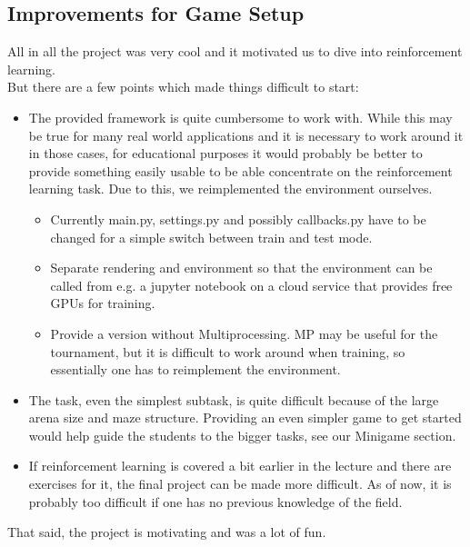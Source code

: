 \subsection{Improvements for Game Setup\johannes}
All in all the project was very cool and it motivated us to dive into reinforcement learning. \\
But there are a few points which made things difficult to start:
\begin{itemize}
	\item{The provided framework is quite cumbersome to work with. While this may be true for many real world applications and it is necessary to work around it in those cases, for educational purposes it would probably be better to provide something easily usable to be able concentrate on the reinforcement learning task. Due to this, we reimplemented the environment ourselves.}
	\begin{itemize}
		\item{Currently main.py, settings.py and possibly callbacks.py have to be changed for a simple switch between train and test mode.}
		\item{Separate rendering and environment so that the environment can be called from e.g. a jupyter notebook on a cloud service that provides free GPUs for training.}
		\item{Provide a version without Multiprocessing. MP may be useful for the tournament, but it is difficult to work around when training, so essentially one has to reimplement the environment.}
	\end{itemize}
	\item{The task, even the simplest subtask, is quite difficult because of the large arena size and maze structure. Providing an even simpler game to get started would help guide the students to the bigger tasks, see our Minigame section.}
	\item{If reinforcement learning is covered a bit earlier in the lecture and there are exercises for it, the final project can be made more difficult. As of now, it is probably too difficult if one has no previous knowledge of the field.}
\end{itemize}
That said, the project is motivating and was a lot of fun.
